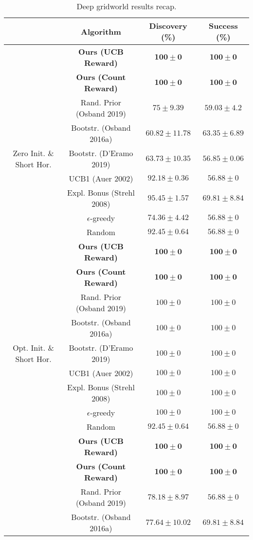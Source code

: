 \documentclass{article}
\begin{document}
\begin{table}[h]
\centering
{}
\caption{Deep gridworld results recap.}
\begin{tabular}{ c | c | c c }
 & Algorithm & Discovery (\%) & Success (\%) \\
 \hline
 & \textbf{Ours (UCB Reward)} & $\mathbf{100 \pm 0}$ & $\mathbf{100 \pm 0}$ \\
 & \textbf{Ours (Count Reward)} & $\mathbf{100 \pm 0}$ & $\mathbf{100 \pm 0}$ \\
 & Rand. Prior (Osband 2019) & $75 \pm 9.39$ & $59.03 \pm 4.2$ \\
 & Bootstr. (Osband 2016a) & $60.82 \pm 11.78$ & $63.35 \pm 6.89$ \\
 Zero Init. \& Short Hor. & Bootstr. (D'Eramo 2019) & $63.73 \pm 10.35$ & $56.85 \pm 0.06$ \\
 & UCB1 (Auer 2002) & $92.18 \pm 0.36$ & $56.88 \pm 0$ \\
 & Expl. Bonus (Strehl 2008) & $95.45 \pm 1.57$ & $69.81 \pm 8.84$ \\
 & $\epsilon$-greedy & $74.36 \pm 4.42$ & $56.88 \pm 0$ \\
 & Random & $92.45 \pm 0.64$ & $56.88 \pm 0$ \\
 \hline
 & \textbf{Ours (UCB Reward)} & $\mathbf{100 \pm 0}$ & $\mathbf{100 \pm 0}$ \\
 & \textbf{Ours (Count Reward)} & $\mathbf{100 \pm 0}$ & $\mathbf{100 \pm 0}$ \\
 & Rand. Prior (Osband 2019) & $100 \pm 0$ & $100 \pm 0$ \\
 & Bootstr. (Osband 2016a) & $100 \pm 0$ & $100 \pm 0$ \\
 Opt. Init. \& Short Hor. & Bootstr. (D'Eramo 2019) & $100 \pm 0$ & $100 \pm 0$ \\
 & UCB1 (Auer 2002) & $100 \pm 0$ & $100 \pm 0$ \\
 & Expl. Bonus (Strehl 2008) & $100 \pm 0$ & $100 \pm 0$ \\
 & $\epsilon$-greedy & $100 \pm 0$ & $100 \pm 0$ \\
 & Random & $92.45 \pm 0.64$ & $56.88 \pm 0$ \\
 \hline
 & \textbf{Ours (UCB Reward)} & $\mathbf{100 \pm 0}$ & $\mathbf{100 \pm 0}$  \\
 & \textbf{Ours (Count Reward)} & $\mathbf{100 \pm 0}$ & $\mathbf{100 \pm 0}$ \\
 & Rand. Prior (Osband 2019) & $78.18 \pm 8.97$ & $56.88 \pm 0$ \\
 & Bootstr. (Osband 2016a) & $77.64 \pm 10.02$ & $69.81 \pm 8.84$ \\

\end{tabular}
\end{table}
\end{document}
